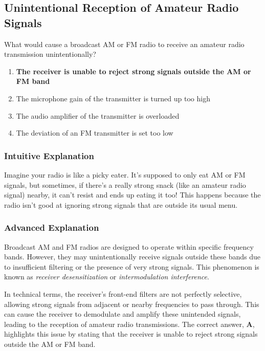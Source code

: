 \subsection{Unintentional Reception of Amateur Radio Signals}
\label{T7B02}

\begin{tcolorbox}[colback=gray!10!white,colframe=black!75!black,title=T7B02]
What would cause a broadcast AM or FM radio to receive an amateur radio transmission unintentionally?
\begin{enumerate}[label=\Alph*)]
    \item \textbf{The receiver is unable to reject strong signals outside the AM or FM band}
    \item The microphone gain of the transmitter is turned up too high
    \item The audio amplifier of the transmitter is overloaded
    \item The deviation of an FM transmitter is set too low
\end{enumerate}
\end{tcolorbox}

\subsubsection{Intuitive Explanation}
Imagine your radio is like a picky eater. It’s supposed to only eat AM or FM signals, but sometimes, if there’s a really strong snack (like an amateur radio signal) nearby, it can’t resist and ends up eating it too! This happens because the radio isn’t good at ignoring strong signals that are outside its usual menu.

\subsubsection{Advanced Explanation}
Broadcast AM and FM radios are designed to operate within specific frequency bands. However, they may unintentionally receive signals outside these bands due to insufficient filtering or the presence of very strong signals. This phenomenon is known as \textit{receiver desensitization} or \textit{intermodulation interference}. 

In technical terms, the receiver's front-end filters are not perfectly selective, allowing strong signals from adjacent or nearby frequencies to pass through. This can cause the receiver to demodulate and amplify these unintended signals, leading to the reception of amateur radio transmissions. The correct answer, \textbf{A}, highlights this issue by stating that the receiver is unable to reject strong signals outside the AM or FM band.

